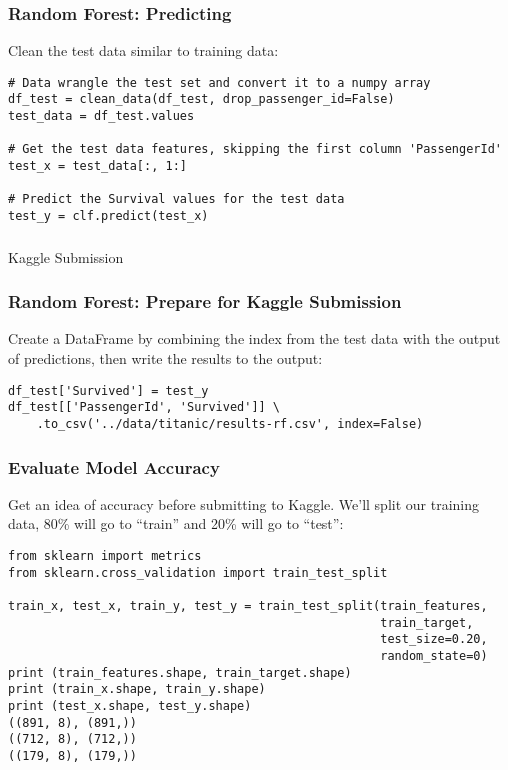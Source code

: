\begin{frame}[fragile]\frametitle{Random Forest: Predicting}
Clean the test data similar to training data:
\begin{lstlisting}
# Data wrangle the test set and convert it to a numpy array
df_test = clean_data(df_test, drop_passenger_id=False)
test_data = df_test.values

# Get the test data features, skipping the first column 'PassengerId'
test_x = test_data[:, 1:]

# Predict the Survival values for the test data
test_y = clf.predict(test_x)
\end{lstlisting}
\end{frame}

\begin{frame}[fragile]\frametitle{}
\begin{center}
{\Large Kaggle Submission}
\end{center}
\end{frame}

\begin{frame}[fragile]\frametitle{Random Forest: Prepare for Kaggle Submission}
Create a DataFrame by combining the index from the test data with the output of predictions, then write the results to the output:
\begin{lstlisting}
df_test['Survived'] = test_y
df_test[['PassengerId', 'Survived']] \
    .to_csv('../data/titanic/results-rf.csv', index=False)
\end{lstlisting}
\end{frame}

\begin{frame}[fragile]\frametitle{Evaluate Model Accuracy}
Get an idea of accuracy before submitting to Kaggle.
We'll split our training data, 80\% will go to ``train'' and 20\% will go to ``test'':
\begin{lstlisting}
from sklearn import metrics
from sklearn.cross_validation import train_test_split

train_x, test_x, train_y, test_y = train_test_split(train_features, 
                                                    train_target, 
                                                    test_size=0.20, 
                                                    random_state=0)
print (train_features.shape, train_target.shape)
print (train_x.shape, train_y.shape)
print (test_x.shape, test_y.shape)
((891, 8), (891,))
((712, 8), (712,))
((179, 8), (179,))
\end{lstlisting}
\end{frame}

